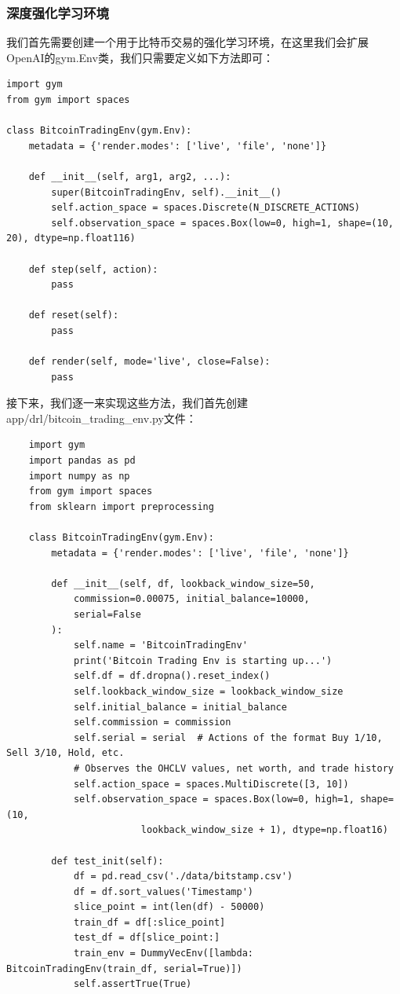 \documentclass{article}
\begin{document}
\subsubsection{深度强化学习环境}
我们首先需要创建一个用于比特币交易的强化学习环境，在这里我们会扩展OpenAI的gym.Env类，我们只需要定义如下方法即可：
\begin{lstlisting}
import gym
from gym import spaces

class BitcoinTradingEnv(gym.Env):
    metadata = {'render.modes': ['live', 'file', 'none']}

    def __init__(self, arg1, arg2, ...):
        super(BitcoinTradingEnv, self).__init__()
        self.action_space = spaces.Discrete(N_DISCRETE_ACTIONS)
        self.observation_space = spaces.Box(low=0, high=1, shape=(10, 20), dtype=np.float116)

    def step(self, action):
        pass

    def reset(self):
        pass

    def render(self, mode='live', close=False):
        pass
\end{lstlisting} 
接下来，我们逐一来实现这些方法，我们首先创建app/drl/bitcoin\_trading\_env.py文件：
\begin{lstlisting}
    import gym
    import pandas as pd
    import numpy as np
    from gym import spaces
    from sklearn import preprocessing
    
    class BitcoinTradingEnv(gym.Env):
        metadata = {'render.modes': ['live', 'file', 'none']}
    
        def __init__(self, df, lookback_window_size=50,
            commission=0.00075, initial_balance=10000,
            serial=False
        ):
            self.name = 'BitcoinTradingEnv'
            print('Bitcoin Trading Env is starting up...')
            self.df = df.dropna().reset_index()
            self.lookback_window_size = lookback_window_size
            self.initial_balance = initial_balance
            self.commission = commission
            self.serial = serial  # Actions of the format Buy 1/10, Sell 3/10, Hold, etc.
            # Observes the OHCLV values, net worth, and trade history
            self.action_space = spaces.MultiDiscrete([3, 10])
            self.observation_space = spaces.Box(low=0, high=1, shape=(10, 
                        lookback_window_size + 1), dtype=np.float16)

        def test_init(self):
            df = pd.read_csv('./data/bitstamp.csv')
            df = df.sort_values('Timestamp')
            slice_point = int(len(df) - 50000)
            train_df = df[:slice_point]
            test_df = df[slice_point:]
            train_env = DummyVecEnv([lambda: BitcoinTradingEnv(train_df, serial=True)])
            self.assertTrue(True)
\end{lstlisting}
\end{document}
